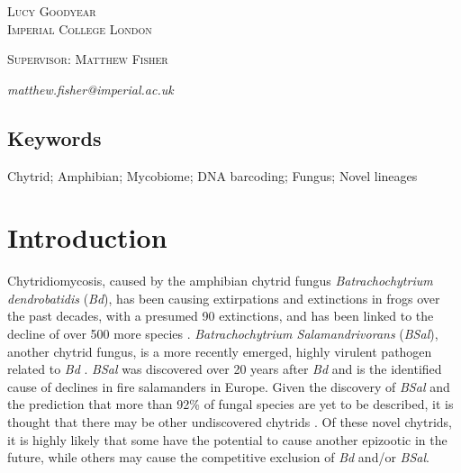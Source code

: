 \documentclass[11pt, a4paper, titlepage]{article}
\begin{document}
\begin{titlepage}
	\vspace{0.5\baselineskip} %
	
	{\scshape\Large Lucy Goodyear \\
		Imperial College London} %
	
	\vspace{0.5\baselineskip} %
	
		\vspace{0.5\baselineskip} %
	
	{\scshape\Large Supervisor: Matthew Fisher} %

	\textit{matthew.fisher@imperial.ac.uk}
	
\end{titlepage}




\subsection*{Keywords}
Chytrid; Amphibian; Mycobiome; DNA barcoding; Fungus; Novel lineages

\section{Introduction}

Chytridiomycosis, caused by the amphibian chytrid fungus \textit{Batrachochytrium dendrobatidis} (\textit{Bd}), has been causing extirpations and extinctions in frogs over the past decades, with a presumed 90 extinctions, and has been linked to the decline of over 500 more species \parencite{Scheele2019}. \textit{Batrachochytrium Salamandrivorans} (\textit{BSal}), another chytrid fungus, is a more recently emerged, highly virulent pathogen related to \textit{Bd} \parencite{Martel2013}. \textit{BSal} was discovered over 20 years after \textit{Bd} and is the identified cause of declines in fire salamanders in Europe. Given the discovery of \textit{BSal} and the prediction that more than 92\% of fungal species are yet to be described, it is thought that there may be other undiscovered chytrids \parencite{hawksworth2017fungal}. Of these novel chytrids, it is highly likely that some have the potential to cause another epizootic in the future, while others may cause the competitive exclusion of \textit{Bd} and/or \textit{BSal}.
\end{document}
